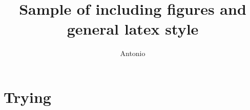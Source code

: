\documentclass[a4paper,10pt]{article}
\title{Sample of including figures and general latex style}
\author{Antonio}
\begin{document}
\maketitle


\section{Trying}

\blindtext[7]
\end{document}
